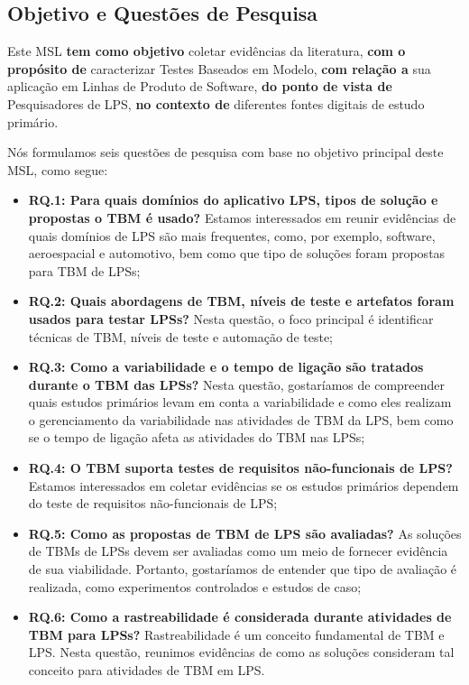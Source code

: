 \subsection{Objetivo e Questões de Pesquisa}
\label{sec:secmsl_objetivos_equestao}

Este MSL \textbf{tem como objetivo} coletar evidências da literatura, \textbf{com o propósito de} caracterizar Testes Baseados em Modelo, \textbf{com relação a} sua aplicação em Linhas de Produto de Software, \textbf{do ponto de vista de} Pesquisadores de LPS, \textbf{no contexto de} diferentes fontes digitais de estudo primário.

Nós formulamos seis questões de pesquisa com base no objetivo principal deste MSL, como segue:

\begin{itemize}
	
	\item \textbf{RQ.1: Para quais domínios do aplicativo LPS, tipos de solução e propostas o TBM é usado?}%
	Estamos interessados em reunir evidências de quais domínios de LPS são mais frequentes, como, por exemplo, software, aeroespacial e automotivo, bem como que tipo de soluções foram propostas para TBM de LPSs;
	
	\item \textbf{RQ.2: Quais abordagens de TBM, níveis de teste e artefatos foram usados para testar LPSs?} Nesta questão, o foco principal é identificar técnicas de TBM, níveis de teste e automação de teste;
	
	\item \textbf{RQ.3: Como a variabilidade e o tempo de ligação são tratados durante o TBM das LPSs?}%
	Nesta questão, gostaríamos de compreender quais estudos primários levam em conta a variabilidade e como eles realizam o gerenciamento da variabilidade nas atividades de TBM da LPS, bem como se o tempo de ligação afeta as atividades do TBM nas LPSs;
	
	\item \textbf{RQ.4: O TBM suporta testes de requisitos não-funcionais de LPS?} Estamos interessados em coletar evidências se os estudos primários dependem do teste de requisitos não-funcionais de LPS;
	
	\item \textbf{RQ.5: Como as propostas de TBM de LPS são avaliadas?} As soluções de TBMs de LPSs devem ser avaliadas como um meio de fornecer evidência de sua viabilidade. Portanto, gostaríamos de entender que tipo de avaliação é realizada, como experimentos controlados e estudos de caso;
	
	\item \textbf{RQ.6: Como a rastreabilidade é considerada durante atividades de TBM para LPSs?} Rastreabilidade é um conceito fundamental de TBM e LPS. Nesta questão, reunimos evidências de como as soluções consideram tal conceito para atividades de TBM em LPS.
	
\end{itemize}

